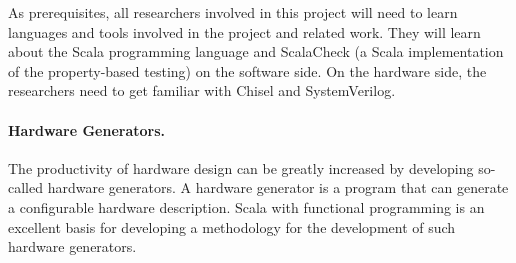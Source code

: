 \documentclass[fleqn,12pt]{article}
\begin{document}



As prerequisites, all researchers involved in this project will need to learn
languages and tools involved in the project and related work.
They will learn about the Scala programming language and ScalaCheck
(a Scala implementation of the property-based testing) on the software side.
On the hardware side,
the researchers need to get familiar with Chisel and SystemVerilog.


\paragraph{Hardware Generators.}

The productivity of hardware design can be greatly increased by developing so-called
hardware generators. A hardware generator is a program that can generate a configurable
hardware description.
Scala with functional programming is an excellent basis for developing a methodology for the
development of such hardware generators.


\end{document}
